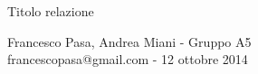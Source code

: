 \documentclass[11pt, twoside, a4paper]{article}
\begin{document}
	\begin{center}
	    	{\huge Titolo relazione}

	    	\vspace{0.1cm}

		{Francesco Pasa, Andrea Miani - Gruppo A5} \\
		{francescopasa@gmail.com - 12 ottobre 2014}

		\vspace{-0.2cm}
	\end{center}

	
	
	
	
\end{document}
